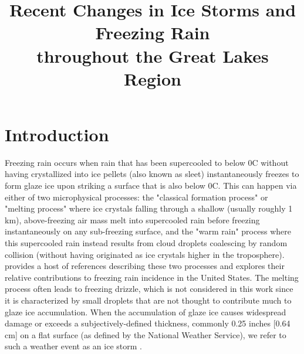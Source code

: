 \documentclass[twocol]{ametsoc}
\title{Recent Changes in Ice Storms and Freezing Rain\\ throughout the Great Lakes Region}
\affiliation{ National Renewable Energy Laboratory, Golden, Colorado}
\begin{document}
\maketitle
%
\section{Introduction}
Freezing rain occurs when rain that has been supercooled to below 0\degree C without having crystallized into ice pellets (also known as sleet) instantaneously freezes to form glaze ice upon striking a surface that is also below 0\degree C. This can happen via either of two microphysical processes: the "classical formation process" or "melting process" where ice crystals falling through a shallow (usually roughly 1 km), above-freezing air mass melt into supercooled rain before freezing instantaneously on any sub-freezing surface, and the "warm rain" process where this supercooled rain instead results from cloud droplets coalescing by random collision (without having originated as ice crystals higher in the troposphere). \citet{rauber2000relative} provides a host of references describing these two processes and explores their relative contributions to freezing rain incidence in the United States. The melting process often leads to freezing drizzle, which is not considered in this work since it is characterized by small droplets that are not thought to contribute much to glaze ice accumulation. When the accumulation of glaze ice causes widespread damage or exceeds a subjectively-defined thickness, commonly 0.25 inches [0.64 cm] on a flat surface (as defined by the National Weather Service), we refer to such a weather event as an ice storm \citep{nwsglossary}.
\end{document}
